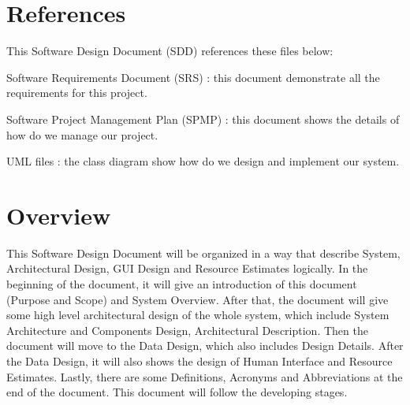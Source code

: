 \documentclass[11pt, a4paper]{report}
\begin{document}
\section{References}
This Software Design Document (SDD) references these files below:
\newline
\item Software Requirements Document (SRS) : this document demonstrate all the requirements for this project.
\newline
\item Software Project Management Plan (SPMP) : this document shows the details of how do we manage our project.
\newline
\item UML files : the class diagram show how do we design and implement our system.
\newline


\section{Overview}
This Software Design Document will be organized in a way that describe System, Architectural Design, GUI Design and Resource Estimates logically. In the beginning of the document, it will give an introduction of this document (Purpose and Scope) and System Overview. After that, the document will give some high level architectural design of the whole system, which include System Architecture and Components Design, Architectural Description. Then the document will move to the Data Design, which also includes Design Details. After the Data Design, it will also shows the design of Human Interface and Resource Estimates. Lastly, there are some Definitions, Acronyms and Abbreviations at the end of the document. This document will follow the developing stages.
\end{document}
